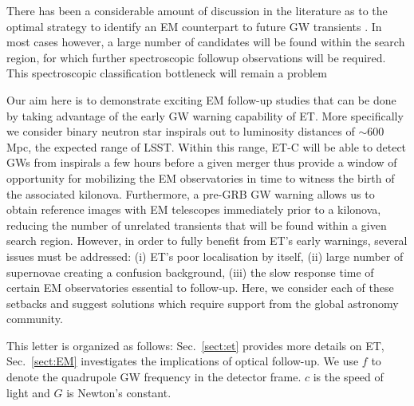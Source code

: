 \documentclass{aa}
\begin{document}
There has been a considerable amount of discussion in the literature as to the optimal strategy to identify an EM counterpart to future GW transients \citep{2016ApJ...820..136G, 2011MNRAS.415L..26C, 2016A&A...592A..82G, 2017ApJ...834...84C, 2014MNRAS.437..649S, 2016MNRAS.462.1085A}. In most cases however, a large number of candidates will be found within the search region, for which further spectroscopic followup observations will be required. This spectroscopic classification bottleneck will remain a problem


Our aim here is to demonstrate exciting EM follow-up studies that can be done by taking advantage of the early GW warning capability of ET. More specifically we
consider binary neutron star inspirals
out to luminosity distances of $\sim 600\,$Mpc, 
the expected range of LSST. Within this range,
ET-C will be able to detect GWs from inspirals
a few hours before a given merger thus provide
a window of opportunity for mobilizing the EM
observatories in time to witness the birth of 
the associated kilonova. Furthermore, a pre-GRB GW warning allows us to 
obtain reference images with EM telescopes immediately prior to a kilonova, reducing the number
of unrelated transients that will be found within a given search region.
However, in order to
fully benefit from ET's early warnings, several
issues must be addressed: (i) ET's poor localisation by itself, (ii) large number of 
supernovae creating a confusion background, 
(iii) the slow response time of certain EM 
observatories essential to follow-up. %
Here, we consider each of these setbacks and
suggest solutions which require support from the global astronomy community.

This letter is organized as follows: Sec.~\ref{sect:et} provides more details on ET,
Sec.~\ref{sect:EM} investigates the implications
of optical follow-up. %
We use $f$ to denote the quadrupole GW frequency
in the detector frame. $c$ is the speed of light and $G$ is Newton's constant.
\end{document}
